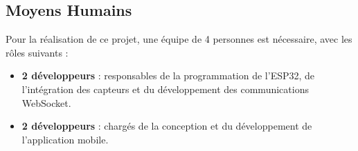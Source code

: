 		\subsection{Moyens Humains}
	Pour la réalisation de ce projet, une équipe de 4 personnes est nécessaire, avec les rôles suivants :
		\begin{itemize}
			\item \textbf{2 développeurs} : responsables de la programmation de l’ESP32, de l’intégration des capteurs et du développement des communications WebSocket.
			\item \textbf{2 développeurs} : chargés de la conception et du développement de l’application mobile.
		\end{itemize}

\setcounter{page}{1}       





